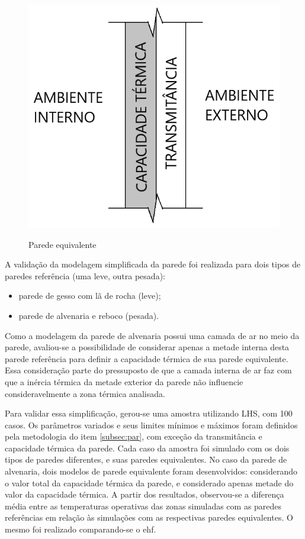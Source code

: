 \begin{figure}[h]
	\centering
	\caption{Parede equivalente}
	\includegraphics[width=.3\linewidth]{img/parede_eq2.png}
	\label{fig:parede_eq}
\end{figure}

A validação da modelagem simplificada da parede foi realizada para dois tipos de paredes referência (uma leve, outra pesada):

\begin{itemize}
	\item parede de gesso com lã de rocha (leve);
	\item parede de alvenaria e reboco (pesada).
\end{itemize}

Como a modelagem da parede de alvenaria possui uma camada de ar no meio da parede, avaliou-se a possibilidade de considerar apenas a metade interna desta parede referência para definir a capacidade térmica de sua parede equivalente. Essa consideração parte do pressuposto de que a camada interna de ar faz com que a inércia térmica da metade exterior da parede não influencie consideravelmente a zona térmica analisada.

Para validar essa simplificação, gerou-se uma amostra utilizando LHS, com 100 casos.
Os parâmetros variados e seus limites mínimos e máximos foram definidos pela metodologia do item \ref{subsec:par}, com exceção da transmitância e capacidade térmica da parede.  %
Cada caso da amostra foi simulado com os dois tipos de paredes diferentes, e suas paredes equivalentes. No caso da parede de alvenaria, dois modelos de parede equivalente foram desenvolvidos: considerando o valor total da capacidade térmica da parede, e considerado apenas metade do valor da capacidade térmica.
A partir dos resultados, observou-se a diferença média entre as temperaturas operativas das zonas simuladas com as paredes referências em relação às simulações com as respectivas paredes equivalentes. O mesmo foi realizado comparando-se o \acrshort{ehf}.

